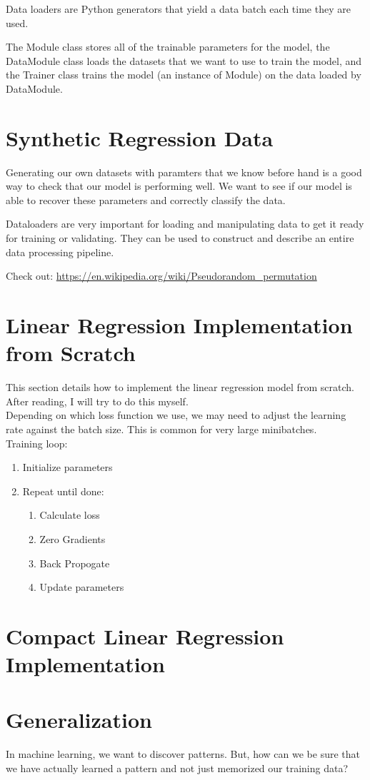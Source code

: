\documentclass{report}
\begin{document}
Data loaders are Python generators that yield a data batch each time they are used. 

The Module class stores all of the trainable parameters for the model, the DataModule class loads the datasets that we want to use to train the model, and the Trainer class trains the model (an instance of Module) on the data loaded by DataModule. 

\section{Synthetic Regression Data}

Generating our own datasets with paramters that we know before hand is a good way to check that our model is performing well. We want to see if our model is able to recover these parameters and correctly classify the data. 

Dataloaders are very important for loading and manipulating data to get it ready for training or validating. They can be used to construct and describe an entire data processing pipeline. 

Check out: \url{https://en.wikipedia.org/wiki/Pseudorandom_permutation}

\section{Linear Regression Implementation from Scratch}

This section details how to implement the linear regression model from scratch. After reading, I will try to do this myself. 
\\

Depending on which loss function we use, we may need to adjust the learning rate against the batch size. This is common for very large minibatches.
\\

Training loop: 
\begin{enumerate}
    \item Initialize parameters
    \item Repeat until done: 
    \begin{enumerate}
        \item Calculate loss
        \item Zero Gradients
        \item Back Propogate
        \item Update parameters
    \end{enumerate}
\end{enumerate}

\section{Compact Linear Regression Implementation}

\section{Generalization}

In machine learning, we want to discover patterns. But, how can we be sure that we have actually learned a pattern and not just memorized our training data? 
\end{document}
